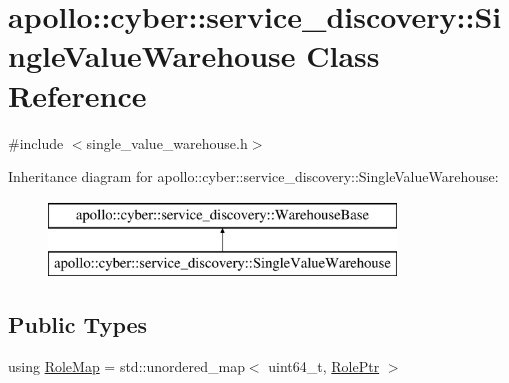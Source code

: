 \hypertarget{classapollo_1_1cyber_1_1service__discovery_1_1SingleValueWarehouse}{\section{apollo\-:\-:cyber\-:\-:service\-\_\-discovery\-:\-:Single\-Value\-Warehouse Class Reference}
\label{classapollo_1_1cyber_1_1service__discovery_1_1SingleValueWarehouse}
}


{\ttfamily \#include $<$single\-\_\-value\-\_\-warehouse.\-h$>$}

Inheritance diagram for apollo\-:\-:cyber\-:\-:service\-\_\-discovery\-:\-:Single\-Value\-Warehouse\-:\begin{figure}[H]
\begin{center}
\leavevmode
\includegraphics[height=2.000000cm]{classapollo_1_1cyber_1_1service__discovery_1_1SingleValueWarehouse}
\end{center}
\end{figure}
\subsection*{Public Types}
\begin{DoxyCompactItemize}
\item 
using \hyperlink{classapollo_1_1cyber_1_1service__discovery_1_1SingleValueWarehouse_a8f248187a1dd8abbcf81969435791333}{Role\-Map} = std\-::unordered\-\_\-map$<$ uint64\-\_\-t, \hyperlink{namespaceapollo_1_1cyber_1_1service__discovery_a47c65bbb4b41d9ae41bfbd33271df525}{Role\-Ptr} $>$
\end{DoxyCompactItemize}
